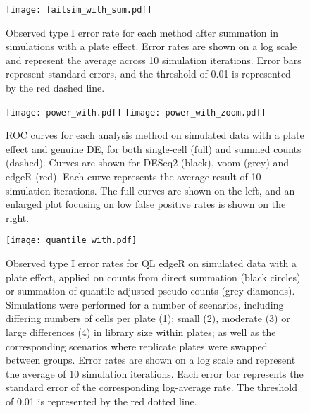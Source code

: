 \documentclass[oupdraft]{bio}
\begin{document}
\begin{figure}[!p]
\begin{center}
\texttt{[image: failsim\_with\_sum.pdf]}
\end{center}
\caption{
    Observed type I error rate for each method after summation in simulations with a plate effect.
    Error rates are shown on a log scale and represent the average across 10 simulation iterations.
    Error bars represent standard errors, and the threshold of 0.01 is represented by the red dashed line.
}
\label{fig:platesum}
\end{figure}

\begin{figure}[!p]
\begin{center}
\texttt{[image: power\_with.pdf]}
\texttt{[image: power\_with\_zoom.pdf]}
\end{center}
\caption{
    ROC curves for each analysis method on simulated data with a plate effect and genuine DE, for both single-cell (full) and summed counts (dashed).
    Curves are shown for DESeq2 (black), voom (grey) and edgeR (red).
    Each curve represents the average result of 10 simulation iterations.
    The full curves are shown on the left, and an enlarged plot focusing on low false positive rates is shown on the right.
}
\label{fig:roc}
\end{figure}

\begin{figure}[!p]
\begin{center}
\texttt{[image: quantile\_with.pdf]}
\end{center}
\caption{
    Observed type I error rates for QL edgeR on simulated data with a plate effect, 
        applied on counts from direct summation (black circles) or summation of quantile-adjusted pseudo-counts (grey diamonds). 
    Simulations were performed for a number of scenarios, including differing numbers of cells per plate (1);
        small (2), moderate (3) or large differences (4) in library size within plates;
        as well as the corresponding scenarios where replicate plates were swapped between groups.
    Error rates are shown on a log scale and represent the average of 10 simulation iterations.
    Each error bar represents the standard error of the corresponding log-average rate.
    The threshold of 0.01 is represented by the red dotted line.
}
\label{fig:complexplate}
\end{figure}
\end{document}
